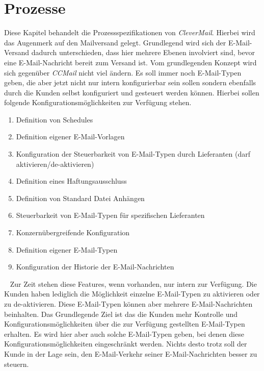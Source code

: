 \chapter{Prozesse}
\label{cha:clevermail-prozesse}
Diese Kapitel behandelt die Prozessspezifikationen von \emph{CleverMail}. Hierbei wird das Augenmerk auf den Mailversand gelegt. Grundlegend wird sich der E-Mail-Versand dadurch unterschieden, dass hier mehrere Ebenen involviert sind, bevor eine E-Mail-Nachricht bereit zum Versand ist. Vom grundlegenden Konzept wird sich gegenüber \emph{CCMail} nicht viel ändern. Es soll immer noch E-Mail-Typen geben, die aber jetzt nicht nur intern konfigurierbar sein sollen sondern ebenfalls durch die Kunden selbst konfiguriert und gesteuert werden können. Hierbei sollen folgende Konfigurationsmöglichkeiten zur Verfügung stehen.
\begin{enumerate}
	\item Definition von Schedules
	\item Definition eigener E-Mail-Vorlagen
	\item Konfiguration der Steuerbarkeit von E-Mail-Typen durch Lieferanten (darf aktivieren/de-aktivieren)
	\item Definition eines Haftungsausschluss 
	\item Definition von Standard Datei Anhängen
	\item Steuerbarkeit von E-Mail-Typen für spezifischen Lieferanten
	\item Konzernübergreifende Konfiguration
	\item Definition eigener E-Mail-Typen
	\item Konfiguration der Historie der E-Mail-Nachrichten
\end{enumerate}
\ \newline
Zur Zeit stehen diese Features, wenn vorhanden, nur intern zur Verfügung. Die Kunden haben lediglich die Möglichkeit einzelne E-Mail-Typen zu aktivieren oder zu de-aktivieren. Diese E-Mail-Typen können aber mehrere E-Mail-Nachrichten beinhalten. Das Grundlegende Ziel ist das die Kunden mehr Kontrolle und Konfigurationsmöglichkeiten über die zur Verfügung gestellten E-Mail-Typen erhalten. Es wird hier aber auch solche E-Mail-Typen geben, bei denen diese Konfigurationsmöglichkeiten eingeschränkt werden. Nichts desto trotz soll der Kunde in der Lage sein, den E-Mail-Verkehr seiner E-Mail-Nachrichten besser zu steuern.
\newpage
